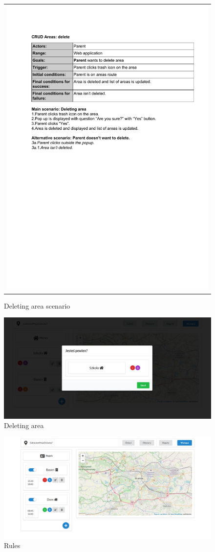 \documentclass{sprawozdanie-agh}
\begin{document}
		\begin{figure}[H] 
			\centering
			\begin{tabular}{c}
				\includegraphics[width=.80\textwidth]{deA_cropped} 
			\end{tabular} 
		\caption{Deleting area scenario}
		\end{figure}

		\begin{figure}[H]
			\centering
			\includegraphics[width=.80\textwidth]{deleteArea}
			\caption{Deleting area}
		\end{figure}

		\begin{figure}[H]
			\centering
			\includegraphics[width=.80\textwidth]{rules}
			\caption{Rules}
		\end{figure}
\end{document}
